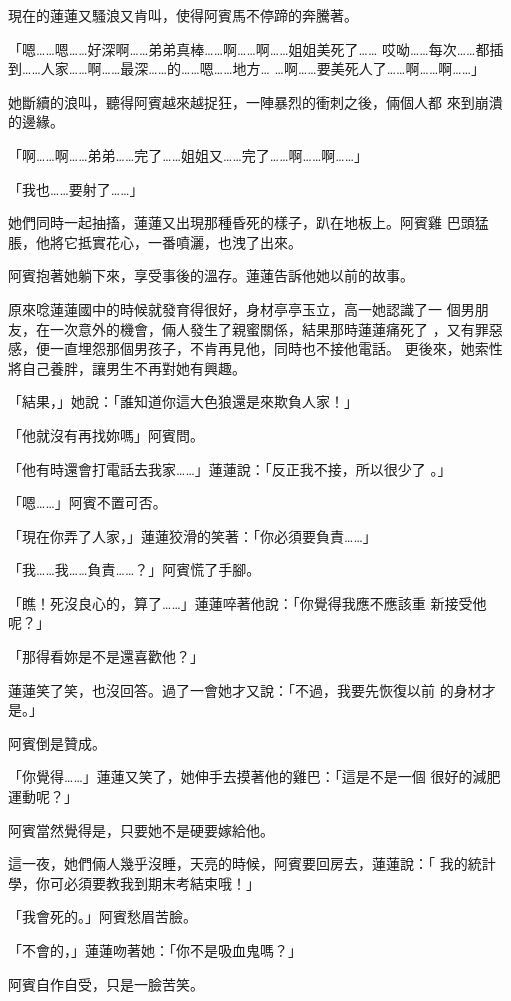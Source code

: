 現在的蓮蓮又騷浪又肯叫，使得阿賓馬不停蹄的奔騰著。

「嗯……嗯……好深啊……弟弟真棒……啊……啊……姐姐美死了……
哎呦……每次……都插到……人家……啊……最深……的……嗯……地方…
…啊……要美死人了……啊……啊……」

她斷續的浪叫，聽得阿賓越來越捉狂，一陣暴烈的衝刺之後，倆個人都
來到崩潰的邊緣。

「啊……啊……弟弟……完了……姐姐又……完了……啊……啊……」

「我也……要射了……」

她們同時一起抽搐，蓮蓮又出現那種昏死的樣子，趴在地板上。阿賓雞
巴頭猛脹，他將它抵實花心，一番噴灑，也洩了出來。

阿賓抱著她躺下來，享受事後的溫存。蓮蓮告訴他她以前的故事。

原來唸蓮蓮國中的時候就發育得很好，身材亭亭玉立，高一她認識了一
個男朋友，在一次意外的機會，倆人發生了親蜜關係，結果那時蓮蓮痛死了
，又有罪惡感，便一直埋怨那個男孩子，不肯再見他，同時也不接他電話。
更後來，她索性將自己養胖，讓男生不再對她有興趣。

「結果，」她說：「誰知道你這大色狼還是來欺負人家！」

「他就沒有再找妳嗎」阿賓問。

「他有時還會打電話去我家……」蓮蓮說：「反正我不接，所以很少了
。」

「嗯……」阿賓不置可否。

「現在你弄了人家，」蓮蓮狡滑的笑著：「你必須要負責……」

「我……我……負責……？」阿賓慌了手腳。

「瞧！死沒良心的，算了……」蓮蓮啐著他說：「你覺得我應不應該重
新接受他呢？」

「那得看妳是不是還喜歡他？」

蓮蓮笑了笑，也沒回答。過了一會她才又說：「不過，我要先恢復以前
的身材才是。」

阿賓倒是贊成。

「你覺得……」蓮蓮又笑了，她伸手去摸著他的雞巴：「這是不是一個
很好的減肥運動呢？」

阿賓當然覺得是，只要她不是硬要嫁給他。

這一夜，她們倆人幾乎沒睡，天亮的時候，阿賓要回房去，蓮蓮說：「
我的統計學，你可必須要教我到期末考結束哦！」

「我會死的。」阿賓愁眉苦臉。

「不會的，」蓮蓮吻著她：「你不是吸血鬼嗎？」

阿賓自作自受，只是一臉苦笑。










